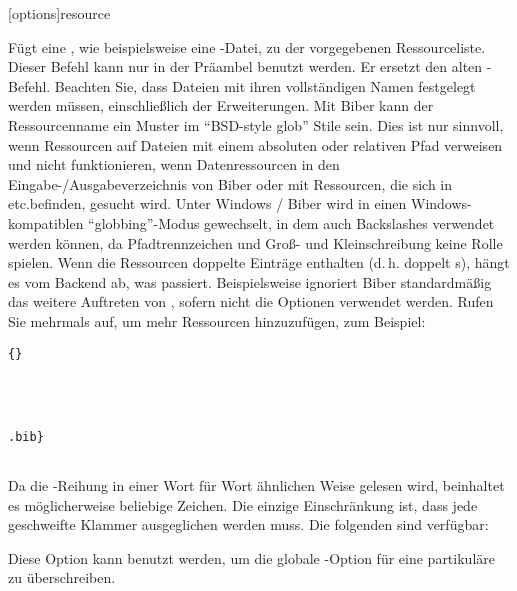 \documentclass{ltxdockit}[2011/03/25]
\newcommand*{\biber}{Biber\xspace}
\begin{document}
\begin{ltxsyntax}

[options]{resource}

Fügt eine , wie beispielsweise eine -Datei, zu der
vorgegebenen Ressourceliste. Dieser Befehl kann nur in der Präambel benutzt
werden. Er ersetzt den alten -Befehl. Beachten Sie, dass Dateien mit
ihren vollständigen Namen festgelegt werden müssen, einschließlich der
Erweiterungen. Mit \biber kann der Ressourcenname ein Muster im "`BSD-style glob"' Stile sein.
Dies ist nur sinnvoll, wenn Ressourcen auf Dateien mit einem absoluten oder relativen
Pfad verweisen und nicht funktionieren, wenn Datenressourcen in den Eingabe-/Ausgabeverzeichnis 
von \biber oder mit Ressourcen, die sich in  etc.befinden, gesucht wird.
Unter Windows / \biber wird in einen Windows-kompatiblen "`globbing"'-Modus gewechselt, in
dem auch Backslashes verwendet werden können, da Pfadtrennzeichen und Groß- und 
Kleinschreibung keine Rolle spielen.  Wenn die Ressourcen doppelte Einträge enthalten
(d.\,h. doppelt s), hängt es vom Backend ab, was passiert. Beispielsweise
ignoriert \biber standardmäßig das weitere Auftreten von , sofern nicht die
Optionen  verwendet werden.
Rufen Sie
  mehrmals auf, um mehr Ressourcen hinzuzufügen, zum
Beispiel:       

\begin{lstlisting}[style=latex]{} 




.bib}


\end{lstlisting}
%
Da die -Reihung in einer Wort für Wort ähnlichen Weise gelesen
wird, beinhaltet es möglicherweise beliebige Zeichen. Die einzige Einschränkung
ist, dass jede geschweifte Klammer ausgeglichen werden muss. Die folgenden
 sind verfügbar:    

\begin{optionlist*}


Diese Option kann benutzt werden, um die globale -Option für eine partikuläre  zu überschreiben.
    


\end{optionlist*}
\end{ltxsyntax}
\end{document}
